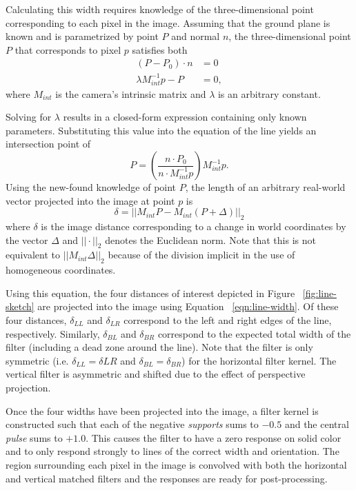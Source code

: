 \documentclass[twocolumn,11pt]{article}
\begin{document}
Calculating this width requires knowledge of the three-dimensional point
corresponding to each pixel in the image. Assuming that the ground plane is
known and is parametrized by point $P$ and normal $n$, the three-dimensional
point $P$ that corresponds to pixel $p$ satisfies both
\begin{align*}
	(P - P_0) \cdot n          &= 0 \\
	\lambda M^{-1}_{int} p - P &= 0,
\end{align*}
where $M_{int}$ is the camera's intrinsic matrix and $\lambda$ is an arbitrary
constant.

Solving for $\lambda$ results in a closed-form expression containing
only known parameters. Substituting this value into the equation of the
line yields an intersection point of
\begin{equation*}
 	P = \left(\frac{n \cdot P_0}{n \cdot M^{-1}_{int} p}\right) M^{-1}_{int} p.
	\label{eqn:line-point}
\end{equation*}
Using the new-found knowledge of point $P$, the length of an arbitrary real-world
vector projected into the image at point $p$ is
\begin{equation}
	\delta = ||M_{int} P - M_{int} (P + \Delta)||_2
	\label{eqn:line-width}
\end{equation}
where $\delta$ is the image distance corresponding to a change in world
coordinates by the vector $\Delta$ and $||\cdot||_2$ denotes the Euclidean
norm. Note that this is not equivalent to $||M_{int}\Delta||_2$ because of the
division implicit in the use of homogeneous coordinates.

Using this equation, the four distances of interest depicted in Figure
~\ref{fig:line-sketch} are projected into the image using Equation
~\ref{eqn:line-width}. Of these four distances, $\delta_{LL}$ and $\delta_{LR}$
correspond to the left and right edges of the line, respectively. Similarly,
$\delta_{BL}$ and $\delta_{BR}$ correspond to the expected total width of the
filter (including a dead zone around the line). Note that the filter is only
symmetric (i.e. $\delta_{LL} = \delta{LR}$ and $\delta_{BL} = \delta_{BR}$) for
the horizontal filter kernel. The vertical filter is asymmetric and shifted due
to the effect of perspective projection.


Once the four widths have been projected into the image, a filter kernel is
constructed such that each of the negative \textit{supports} sums to $-0.5$
and the central \textit{pulse} sums to $+1.0$. This causes the filter to have
a zero response on solid color and to only respond strongly to lines of the
correct width and orientation. The region surrounding each pixel in the image
is convolved with both the horizontal and vertical matched filters and the
responses are ready for post-processing.
\end{document}
